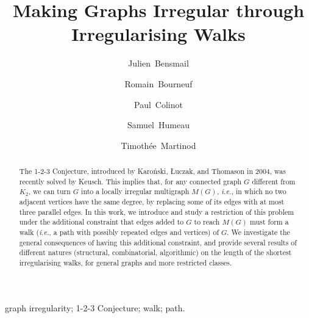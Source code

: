 \documentclass[a4paper,11pt,dvipsnames]{elsarticle}
\begin{document}
\begin{frontmatter}



\title{Making Graphs Irregular through Irregularising Walks}

\author[nice]{Julien~Bensmail}
\author[bordeaux]{Romain~Bourneuf}
\author[grenoble]{Paul~Colinot}
\author[lyon]{Samuel~Humeau}
\author[orleans]{Timothée~Martinod}

\address[nice]{Universit\'e C\^ote d'Azur, CNRS, Inria, I3S, France}
\address[bordeaux]{Univ. Bordeaux, CNRS,  Bordeaux INP, LaBRI, UMR 5800, F-33400, Talence, France}
\address[grenoble]{Univ. Grenoble-Aples, CNRS, Grenoble INP, G-SCOP, UMR 5272, France}
\address[lyon]{ENS de Lyon, CNRS, Université Claude Bernard Lyon 1, LIP, UMR 5668, 69342, Lyon cedex 07, France}
\address[orleans]{Universit\'e d’Orl\'eans, INSA CVL, LIFO, UR 4022, Orl\'eans, France}


\begin{abstract}
The 1-2-3 Conjecture, introduced by Karo\'nski, {\L}uczak, and Thomason in 2004,
was recently solved by Keusch. This implies that, for any connected graph $G$ different from $K_2$,
we can turn $G$ into a locally irregular multigraph $M(G)$, \textit{i.e.}, in which no two adjacent vertices have the same degree,
by replacing some of its edges with at most three parallel edges.
In this work, we introduce and study a restriction of this problem under the additional constraint that edges added to $G$ to reach $M(G)$ must form a walk (\textit{i.e.}, a path with possibly repeated edges and vertices) of $G$.
We investigate the general consequences of having this additional constraint,
and provide several results of different natures (structural, combinatorial, algorithmic) on the length of the shortest irregularising walks,
for general graphs and more restricted classes.
\end{abstract}

\begin{keyword} 
graph irregularity; 1-2-3 Conjecture; walk; path.
\end{keyword}
 
\end{frontmatter}

\newtheorem{theorem}{Theorem}[section]
\newtheorem{lemma}[theorem]{Lemma}
\newtheorem{conjecture}[theorem]{Conjecture}
\newtheorem{observation}[theorem]{Observation}
\newtheorem{claim}[theorem]{Claim}
\newtheorem*{remark}{Remark}
\newtheorem{corollary}[theorem]{Corollary}
\newtheorem{proposition}[theorem]{Proposition}
\newtheorem{question}[theorem]{Question}
\newtheorem{definition}[theorem]{Definition}
\end{document}
